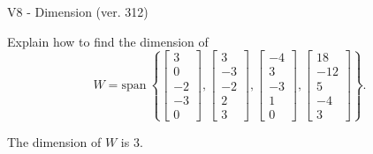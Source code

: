 \begin{exercise}
  \begin{exerciseTitle}V8 - Dimension (ver. 312)\end{exerciseTitle}
  \begin{exerciseStatement}
    Explain how to find the dimension of 
\[W=\mathrm{span}\ \left\{\left[\begin{array}{r}
3 \\
0 \\
-2 \\
-3 \\
0
\end{array}\right] , \left[\begin{array}{r}
3 \\
-3 \\
-2 \\
2 \\
3
\end{array}\right] , \left[\begin{array}{r}
-4 \\
3 \\
-3 \\
1 \\
0
\end{array}\right] , \left[\begin{array}{r}
18 \\
-12 \\
5 \\
-4 \\
3
\end{array}\right]\right\}.\]



  \end{exerciseStatement}
  \begin{exerciseAnswer}
   The dimension of \(W\) is  \(3\).
  


  \end{exerciseAnswer}
\end{exercise}